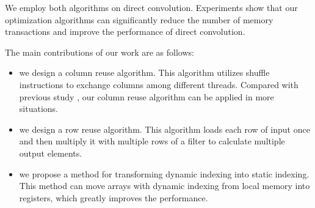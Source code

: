 We employ both algorithms on direct convolution. Experiments show that our optimization algorithms can significantly reduce the number of
memory transactions and improve the performance of direct convolution.

The main contributions of our work are as follows:
\begin{itemize}
  \item we design a column reuse algorithm. This algorithm utilizes shuffle instructions to exchange columns among different threads. Compared
      with previous study \cite{vasilache2014fast}, our column reuse algorithm can be applied in more situations.
  \item we design a row reuse algorithm. This algorithm loads each row of input once and then multiply it with multiple rows of a filter
      to calculate multiple output elements.
  \item we propose a method for transforming dynamic indexing into static indexing. This method can move arrays with dynamic indexing
      from local memory into registers, which greatly improves the performance.
\end{itemize}
